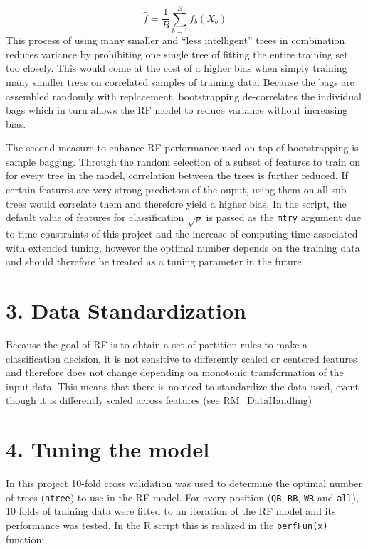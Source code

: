 \documentclass[]{article}
\begin{document}
\[\hat{f}=\frac{1}{B}\sum_{b=1}^{B} f_{b}(X_{b})\] This process of using
many smaller and ``less intelligent'' trees in combination reduces
variance by prohibiting one single tree of fitting the entire training
set too closely. This would come at the cost of a higher bias when
simply training many smaller trees on correlated samples of training
data. Because the bags are assembled randomly with replacement,
bootstrapping de-correlates the individual bags which in turn allows the
RF model to reduce variance without increasing bias.

The second measure to enhance RF performance used on top of
bootstrapping is sample bagging. Through the random selection of a
subset of features to train on for every tree in the model, correlation
between the trees is further reduced. If certain features are very
strong predictors of the ouput, using them on all sub-trees would
correlate them and therefore yield a higher bias. In the script, the
default value of features for classification \(\sqrt{p}\) is passed as
the \texttt{mtry} argument due to time constraints of this project and
the increase of computing time associated with extended tuning, however
the optimal number depends on the training data and should therefore be
treated as a tuning parameter in the future.

\hypertarget{data-standardization}{%
\section{3. Data Standardization}\label{data-standardization}}

Because the goal of RF is to obtain a set of partition rules to make a
classification decision, it is not sensitive to differently scaled or
centered features and therefore does not change depending on monotonic
transformation of the input data. This means that there is no need to
standardize the data used, event though it is differently scaled across
features (see
\href{https://github.com/NicSchuler/DSF_NFLDraftPrediction/tree/master/Data/READMEs}{RM\_DataHandling})

\hypertarget{tuning-the-model}{%
\section{4. Tuning the model}\label{tuning-the-model}}

In this project 10-fold cross validation was used to determine the
optimal number of trees (\texttt{ntree}) to use in the RF model. For
every position (\texttt{QB}, \texttt{RB}, \texttt{WR} and \texttt{all}),
10 folds of training data were fitted to an iteration of the RF model
and its performance was tested. In the R script this is realized in the
\texttt{perfFun(x)} function:
\end{document}
